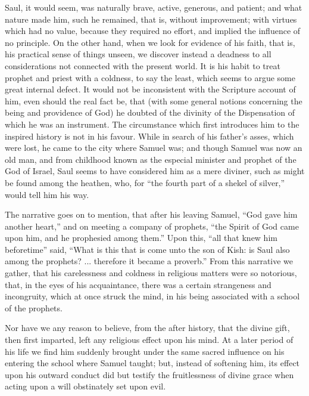 Saul, it would seem, was naturally brave, active, generous, and
patient; and what nature made him, such he remained, that is, without
improvement; with virtues which had no value, because they required no
effort, and implied the influence of no principle. On the other hand,
when we look for evidence of his faith, that is, his practical sense
of things unseen, we discover instead a deadness to all considerations
not connected with the present world. It is his habit to treat prophet
and priest with a coldness, to say the least, which seems to argue
some great internal defect. It would not be inconsistent with the
Scripture account of him, even should the real fact be, that (with
some general notions concerning the being and providence of God) he
doubted of the divinity of the Dispensation of which he was an
instrument. The circumstance which first introduces him to the
inspired history is not in his favour. While in search of his father's
asses, which were lost, he came to the city where Samuel was; and
though Samuel was now an old man, and from childhood known as the
especial minister and prophet of the God of Israel, Saul seems to have
considered him as a mere diviner, such as might be found among the
heathen, who, for ``the fourth part of a shekel of silver,''
would tell him his way.

The narrative goes on to mention, that after his leaving Samuel,
``God gave him another heart,'' and on meeting a company of
prophets, ``the Spirit of God came upon him, and he prophesied
among them.'' Upon this, ``all that knew him beforetime''
said, ``What is this that is come unto the son of Kish: is Saul
also among the prophets? ... therefore it became a proverb.'' From
this narrative we gather, that his carelessness and coldness in
religious matters were so notorious, that, in the eyes of his
acquaintance, there was a certain strangeness and incongruity, which
at once struck the mind, in his being associated with a school of the
prophets.

Nor have we any reason to believe, from the after history, that the
divine gift, then first imparted, left any religious effect upon his
mind. At a later period of his life we find him suddenly brought under
the same sacred influence on his entering the school where Samuel
taught; but, instead of softening him, its effect upon his outward
conduct did but testify the fruitlessness of divine grace when acting
upon a will obstinately set upon evil.

